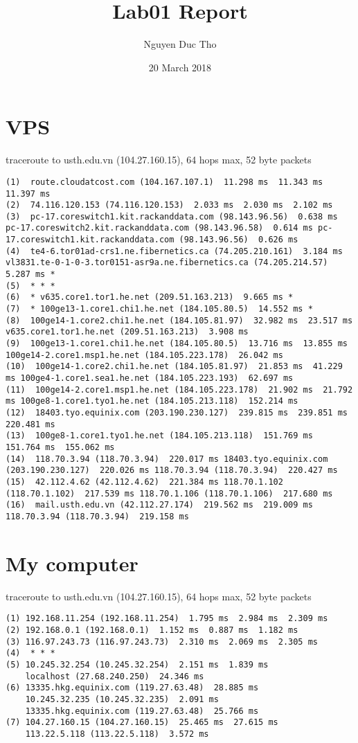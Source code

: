 \documentclass{article}
\title{Lab01 Report}
\author{Nguyen Duc Tho}
\date{20 March 2018}
\begin{document}
\maketitle



\section{VPS}
traceroute to usth.edu.vn (104.27.160.15), 64 hops max, 52 byte packets\linebreak

\begin{lstlisting}
(1)  route.cloudatcost.com (104.167.107.1)  11.298 ms  11.343 ms  11.397 ms
(2)  74.116.120.153 (74.116.120.153)  2.033 ms  2.030 ms  2.102 ms
(3)  pc-17.coreswitch1.kit.rackanddata.com (98.143.96.56)  0.638 ms pc-17.coreswitch2.kit.rackanddata.com (98.143.96.58)  0.614 ms pc-17.coreswitch1.kit.rackanddata.com (98.143.96.56)  0.626 ms
(4)  te4-6.tor01ad-crs1.ne.fibernetics.ca (74.205.210.161)  3.184 ms vl3831.te-0-1-0-3.tor0151-asr9a.ne.fibernetics.ca (74.205.214.57)  5.287 ms *
(5)  * * *
(6)  * v635.core1.tor1.he.net (209.51.163.213)  9.665 ms *
(7)  * 100ge13-1.core1.chi1.he.net (184.105.80.5)  14.552 ms *
(8)  100ge14-1.core2.chi1.he.net (184.105.81.97)  32.982 ms  23.517 ms v635.core1.tor1.he.net (209.51.163.213)  3.908 ms
(9)  100ge13-1.core1.chi1.he.net (184.105.80.5)  13.716 ms  13.855 ms 100ge14-2.core1.msp1.he.net (184.105.223.178)  26.042 ms
(10)  100ge14-1.core2.chi1.he.net (184.105.81.97)  21.853 ms  41.229 ms 100ge4-1.core1.sea1.he.net (184.105.223.193)  62.697 ms
(11)  100ge14-2.core1.msp1.he.net (184.105.223.178)  21.902 ms  21.792 ms 100ge8-1.core1.tyo1.he.net (184.105.213.118)  152.214 ms
(12)  18403.tyo.equinix.com (203.190.230.127)  239.815 ms  239.851 ms  220.481 ms
(13)  100ge8-1.core1.tyo1.he.net (184.105.213.118)  151.769 ms  151.764 ms  155.062 ms
(14)  118.70.3.94 (118.70.3.94)  220.017 ms 18403.tyo.equinix.com (203.190.230.127)  220.026 ms 118.70.3.94 (118.70.3.94)  220.427 ms
(15)  42.112.4.62 (42.112.4.62)  221.384 ms 118.70.1.102 (118.70.1.102)  217.539 ms 118.70.1.106 (118.70.1.106)  217.680 ms
(16)  mail.usth.edu.vn (42.112.27.174)  219.562 ms  219.009 ms 118.70.3.94 (118.70.3.94)  219.158 ms

\end{lstlisting}

\section{My computer}
traceroute to usth.edu.vn (104.27.160.15), 64 hops max, 52 byte packets
\begin{lstlisting}
(1) 192.168.11.254 (192.168.11.254)  1.795 ms  2.984 ms  2.309 ms
(2) 192.168.0.1 (192.168.0.1)  1.152 ms  0.887 ms  1.182 ms
(3) 116.97.243.73 (116.97.243.73)  2.310 ms  2.069 ms  2.305 ms
(4)  * * *
(5) 10.245.32.254 (10.245.32.254)  2.151 ms  1.839 ms
    localhost (27.68.240.250)  24.346 ms
(6) 13335.hkg.equinix.com (119.27.63.48)  28.885 ms
    10.245.32.235 (10.245.32.235)  2.091 ms
    13335.hkg.equinix.com (119.27.63.48)  25.766 ms
(7) 104.27.160.15 (104.27.160.15)  25.465 ms  27.615 ms
    113.22.5.118 (113.22.5.118)  3.572 ms
\end{lstlisting}
\end{document}
